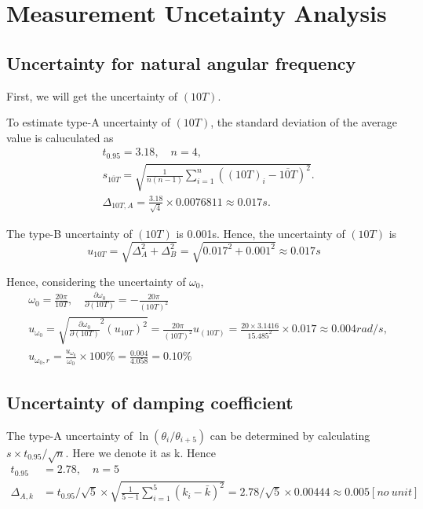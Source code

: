 \section{Measurement Uncetainty Analysis}
\subsection{Uncertainty for natural angular frequency}
    First, we will get the uncertainty of $(10T)$.

    To estimate type-A uncertainty of $(10T)$, the standard deviation of the average value is caluculated as
    \[
    \begin{split}
        &t_{0.95}=3.18,\quad n=4,\\
        &s_{\overline{10T}}=\sqrt{\frac{1}{n(n-1)}\sum_{i=1}^n((10T)_i-\overline{10T})^2}.\\
        &\Delta_{10T,A}=\frac{3.18}{\sqrt{4}}\times0.0076811\approx 0.017s.
    \end{split}
    \]

    The type-B uncertainty of $(10T)$ is 0.001s. Hence, the uncertainty of $(10T)$ is
    \[
        u_{10T}=\sqrt{\Delta_A^2+\Delta_B^2}=\sqrt{0.017^2+0.001^2}\approx 0.017s
    \]

    Hence, considering the uncertainty of $\omega_0$,
    \[
    \begin{split}
        &\omega_0=\frac{20\pi}{10T},\quad \frac{\partial \omega_0}{\partial (10T)}=-\frac{20\pi}{(10T)^2}\\
        &u_{\omega_0}=\sqrt{\frac{\partial \omega_0}{\partial (10T)}^2(u_{10T})^2}=\frac{20\pi}{(10T)^2}u_{(10T)}=\frac{20\times3.1416}{15.485^2}\times0.017\approx0.004rad/s,\\
        &u_{\omega_0,r}=\frac{u_{\omega_0}}{\omega_0}\times100\%=\frac{0.004}{4.058}=0.10\%
    \end{split}
    \]

\subsection{Uncertainty of damping coefficient}
    The type-A uncertainty of $\ln(\theta_i/\theta_{i+5})$ can be determined by calculating $s\times t_{0.95}/\sqrt{n}$. Here we denote it as k. Hence
    \[
    \begin{split}
        t_{0.95}&=2.78,\quad n=5\\
        \Delta_{A,k}&=t_{0.95}/\sqrt{5}\times \sqrt{\frac{1}{5-1}\sum_{i=1}^5(k_i-\bar{k})^2}=2.78/\sqrt{5}\times 0.00444\approx0.005[no\ unit]
    \end{split}
    \]

